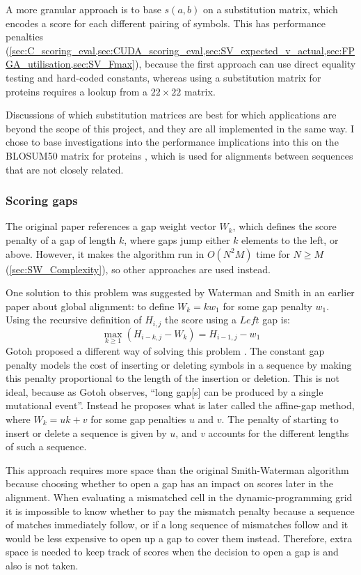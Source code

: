 A more granular approach is to base $s(a,b)$ on a substitution matrix, which encodes a score for each different pairing of symbols.
This has performance penalties (\cref{sec:C_scoring_eval,sec:CUDA_scoring_eval,sec:SV_expected_v_actual,sec:FPGA_utilisation,sec:SV_Fmax}), because the first approach can use direct equality testing and hard-coded constants, whereas using a substitution matrix for proteins requires a lookup from a $22\times22$ matrix.

Discussions of which substitution matrices are best for which applications are beyond the scope of this project, and they are all implemented in the same way.
I chose to base investigations into the performance implications into this on the BLOSUM50 matrix for proteins \cite{BLOSUM}, which is used for alignments between sequences that are not closely related.

\subsubsection{Scoring gaps}
\label{sec:SW_gaps}
The original paper \cite{SW_Original} references a gap weight vector $W_k$, which defines the score penalty of a gap of length $k$, where gaps jump either $k$ elements to the left, or above.
However, it makes the algorithm run in $O(N^2 M)$ time for $N\geq M$ (\cref{sec:SW_Complexity}), so other approaches are used instead.

One solution to this problem was suggested by Waterman and Smith \cite{SW_Metrics} in an earlier paper about global alignment: to define $W_k=kw_1$ for some gap penalty $w_1$.
Using the recursive definition of $H_{i,j}$ the score using a $Left$ gap is:
$$\max_{k \geq 1}(H_{i-k,j} -W_k) = H_{i-1,j} - w_1$$
Gotoh proposed a different way of solving this problem \cite{Gotoh}.
The constant gap penalty models the cost of inserting or deleting symbols in a sequence by making this penalty proportional to the length of the insertion or deletion.
This is not ideal, because as Gotoh observes, ``long gap[s] can be produced by a single mutational event''.
Instead he proposes what is later called the affine-gap method, where $W_k=uk+v$ for some gap penalties $u$ and $v$.
The penalty of starting to insert or delete a sequence is given by $u$, and $v$ accounts for the different lengths of such a sequence.

This approach requires more space than the original Smith-Waterman algorithm because choosing whether to open a gap has an impact on scores later in the alignment.
When evaluating a mismatched cell in the dynamic-programming grid it is impossible to know whether to pay the mismatch penalty because a sequence of matches immediately follow, or if a long sequence of mismatches follow and it would be less expensive to open up a gap to cover them instead.
Therefore, extra space is needed to keep track of scores when the decision to open a gap is and also is not taken.

